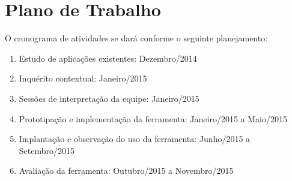 \chapter{Plano de Trabalho}


O cronograma de atividades se dará conforme o seguinte planejamento:

\begin{enumerate}

\item Estudo de aplicações existentes: Dezembro/2014

\item Inquérito contextual: Janeiro/2015

\item Sessões de interpretação da equipe: Janeiro/2015

\item Prototipação e implementação da ferramenta: Janeiro/2015 a Maio/2015

\item Implantação e observação do uso da ferramenta: Junho/2015 a Setembro/2015

\item Avaliação da ferramenta: Outubro/2015 a Novembro/2015

\end{enumerate}
